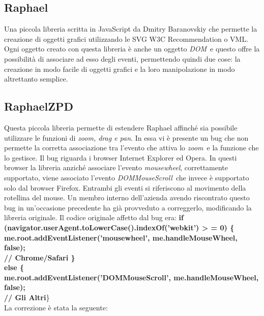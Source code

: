 \subsection{Raphael}
Una piccola libreria scritta in JavaScript da Dmitry Baranovskiy che permette la creazione di oggetti grafici utilizzando le SVG W3C Recommendation o VML. Ogni oggetto creato con questa libreria è anche un oggetto \textit{DOM}\ e questo offre la possibilità di associare ad esso degli eventi, permettendo quindi due cose: la creazione in modo facile di oggetti grafici e la loro manipolazione in modo altrettanto semplice.
\subsection{RaphaelZPD}
Questa piccola libreria permette di estendere Raphael affinché sia possibile utilizzare le funzioni di \textit{zoom, drag e pan}. In essa vi è presente un bug che non permette la corretta associazione tra l'evento che attiva lo \textit{zoom}\ e la funzione che lo gestisce. Il bug riguarda i browser Internet Explorer ed Opera. In questi browser la libreria anziché associare l'evento \textit{mousewheel}, correttamente supportato, viene  associato l'evento \textit{DOMMouseScroll}\ che invece è supportato solo dal browser Firefox. Entrambi gli eventi si riferiscono al movimento della rotellina del mouse. Un membro interno dell'azienda avendo riscontrato questo bug in un'occasione precedente ha già provveduto a correggerlo, modificando la libreria originale. Il codice originale affetto dal bug era: \newline \newline
\hspace*{10mm} \textbf{if (navigator.userAgent.toLowerCase().indexOf(’webkit’) > = 0) \{ \\
\hspace*{15mm} me.root.addEventListener(’mousewheel’, me.handleMouseWheel, false);\\ 
\hspace*{10mm} // Chrome/Safari \} \\ 
\hspace*{10mm} else \{ \\
\hspace*{15mm} me.root.addEventListener(’DOMMouseScroll’, me.handleMouseWheel, false); \\
\hspace*{10mm}// Gli Altri}\} \\
\newline
La correzione è stata la seguente:\newline \newline
